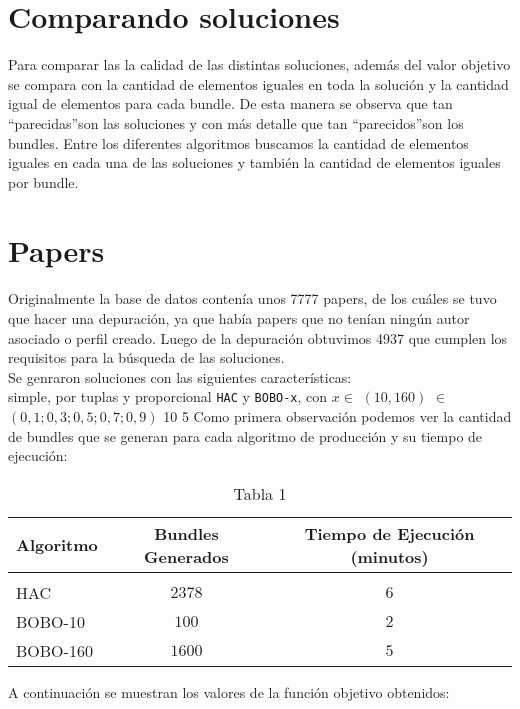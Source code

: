 \section{Comparando soluciones}
Para comparar las la calidad de las distintas soluciones, además del valor objetivo se compara con 
la cantidad de elementos iguales en toda la solución y la cantidad igual de elementos para cada 
bundle. De esta manera se observa que tan \textquotedblleft parecidas\textquotedblright son las 
soluciones y con más detalle que tan \textquotedblleft parecidos\textquotedblright son los bundles. 
Entre los diferentes algoritmos buscamos la cantidad de elementos iguales en cada una de las 
soluciones y también la cantidad de elementos iguales por bundle.
\section{Papers}
Originalmente la base de datos contenía unos 7777 papers, de los cuáles se tuvo que hacer una 
depuración, ya que había papers que no tenían ningún autor asociado o perfil creado. Luego de la 
depuración obtuvimos 4937 que cumplen los requisitos para la búsqueda de las soluciones.\\
Se genraron soluciones con las siguientes características:\\
\Solucion
{}
{simple, por tuplas y proporcional}
{\texttt{HAC} y \texttt{BOBO-x}, con  $x \in$ $(10, 160)$}
{$\in$ $(0,1; 0,3; 0,5; 0,7; 0,9)$}
{10}
{5}
Como primera observación podemos ver la cantidad de bundles que se generan para cada algoritmo de 
producción y su tiempo de ejecución:\\
\begin{table}[h]
  \centering
  \resizebox{\textwidth}{!} {
    \begin{tabular}{lcc}
    Algoritmo & Bundles Generados & Tiempo de Ejecución (minutos) \\
    \hline \\
    HAC       & $2378$              & $6$                             \\
    BOBO-10   & $100$               & $2$                             \\
    BOBO-160  & $1600$              & $5$                             \\
    \end{tabular}
  }
    \caption {Tabla 1}
\end{table}
A continuación se muestran los valores de la función objetivo obtenidos:\\
